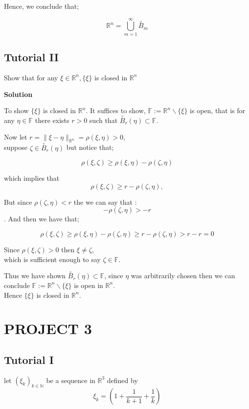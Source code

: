 \documentclass{article}
\begin{document}
Hence, we conclude that;

$$
\mathbb{R}^{n}=\bigcup_{m=1}^{\infty} \stackrel{\circ}{B}_{m}
$$
\newpage
\subsection{Tutorial II}
Show that for any $\xi \in \mathbb{R}^{n},\{\xi\}$ is closed in $\mathbb{R}^{n}$

\textbf{Solution}

To show $\{\xi\}$ is closed in $\mathbb{R}^{n}$. It suffices to show, $\mathbb{F}:=\mathbb{R}^{n} \backslash\{\xi\}$ is open, that is for any $\eta \in \mathbb{F}$ there exists $r>0$ such that $\stackrel{\circ}{B}_{r}(\eta) \subset \mathbb{F}$.

Now let $r=\|\xi-\eta\|_{\mathbb{R}^{n}}=\rho(\xi, \eta)>0$, \\

suppose $\zeta \in \stackrel{\circ}{B}_{r}(\eta)$ but notice that;

$$
\rho(\xi, \zeta) \geq \rho(\xi, \eta)-\rho(\zeta, \eta)
$$

which implies that $$\rho(\xi, \zeta) \geq r-\rho(\zeta, \eta), $$

But since $\rho(\zeta, \eta)<r $  the we can say that :
$$-\rho(\zeta, \eta)>-r$$. And then we have that;

$$
\rho(\xi, \zeta) \geq \rho(\xi, \eta)-\rho(\zeta, \eta) \geq r-\rho(\zeta, \eta)>r-r=0
$$

Since $\rho(\xi, \zeta)>0$ then  $\xi \neq \zeta$,\\

which is sufficient enough to say $\zeta \in \mathbb{F}$. 

Thus we have shown $\stackrel{\circ}{B}_{r}(\eta) \subset \mathbb{F}$, since $\eta$ was arbitrarily chosen then we can conclude $\mathbb{F}:=\mathbb{R}^{n} \backslash\{\xi\}$ is open in $\mathbb{R}^{n}$.\\

Hence $\{\xi\}$ is closed in $\mathbb{R}^{n}$.
\newpage
\section{PROJECT 3}
\subsection{Tutorial I}
let $(\xi_k)_{k \in \mathbb{N}}$ be a sequence in $\mathbb{R}^3$ defined by
$$\xi_k = (1 +\frac{1}{k+1}+\frac{1}{k})$$
\end{document}
